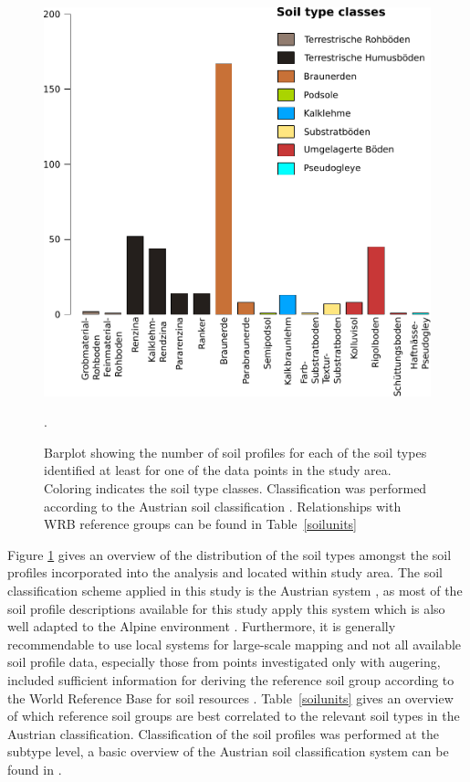 \documentclass[preprint,12pt,authoryear]{elsarticle}
\begin{document}
 \begin{figure}[ht!]
\includegraphics[width=\textwidth,angle=0]{soildistro_AOI.pdf}
\caption{Barplot showing the number of soil profiles for each of the soil types identified at least for one of the data points in the study area. Coloring indicates the soil type classes. Classification was performed according to the Austrian soil classification \citep{Nestroy2000,Nestroy2011}. Relationships with WRB reference groups can be found in Table~\ref{soilunits}}.
\label{fig:soils_studyarea}
\end{figure}
Figure \ref{fig:soils_studyarea} gives an overview of the distribution of the soil types amongst the soil profiles incorporated into the analysis and located within study area. The soil classification scheme applied in this study is the Austrian system \citep{Nestroy2000,Nestroy2011}, as most of the soil profile descriptions available for this study apply this system which is also well adapted to the Alpine environment \citep{Baruck2016}. Furthermore, it is generally recommendable  to use local systems for large-scale mapping and not all available soil profile data, especially those from points investigated only with augering, included sufficient information for deriving the reference soil group according to the World Reference Base for soil resources \citep{wrb}. Table~\ref{soilunits} gives an overview of which reference soil groups are best correlated to the relevant soil types in the Austrian classification. Classification of the soil profiles was performed at the subtype level, a basic overview of the Austrian soil classification system can be found in \cite{Baruck2016}.
\end{document}
